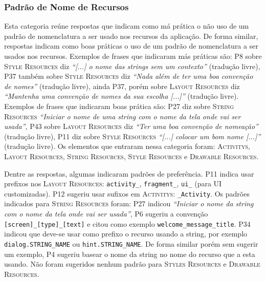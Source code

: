 \subsubsection{Padr\~ao de Nome de Recursos}
Esta categoria re\'une respostas que indicam como m\'a pr\'atica o n\~ao uso de um padr\~ao de nomenclatura a ser usado nos recursos da aplica\c{c}\~ao. De forma similar, respostas indicam como boas pr\'aticas o uso de um padr\~ao de nomenclatura a ser usados nos recursos. Exemplos de frases que indicaram m\'as pr\'aticas s\~ao: P8 sobre \textsc{Style Resources} diz \textit{``[...] o nome das strings sem um contexto''} (tradu\c{c}\~ao livre), P37 tamb\'em sobre \textsc{Style Resources} diz \textit{``Nada al\'em de ter uma boa conven\c{c}\~ao de nomes''} (tradu\c{c}\~ao livre), ainda P37, por\'em sobre \textsc{Layout Resources} diz \textit{``Mantenha uma conven\c{c}\~ao de nomes da sua escolha [...]''} (tradu\c{c}\~ao livre). Exemplos de frases que indicaram boas pr\'atica s\~ao: P27 diz sobre \textsc{String Resources} \textit{``Iniciar o nome de uma string com o nome da tela onde vai ser usada''}, P43 sobre \textsc{Layout Resources} diz \textit{``Ter uma boa conven\c{c}\~ao de nomea\c{c}\~ao''} (tradu\c{c}\~ao livre), P11 diz sobre \textsc{Style Resources} \textit{``[...] colocar um bom nome [...]''} (tradu\c{c}\~ao livre). Os elementos que entraram nessa categoria foram: \textsc{Activitys}, \textsc{Layout Resources}, \textsc{String Resources}, \textsc{Style Resources} e \textsc{Drawable Resources}. 

Dentre as respostas, algumas indicaram padr\~oes de prefer\^encia. P11 indica usar prefixos nos \textsc{Layout Resources}: \texttt{activity\_}, \texttt{fragment\_}, \texttt{ui\_} (para UI customizadas). P12 sugeriu usar sufixos em \textsc{Activitys}: \texttt{\_Activity}. Os padr\~oes indicados para \textsc{String Resources} foram: P27 indicou \textit{``Iniciar o nome da string com o nome da tela onde vai ser usada''}, P6 sugeriu a conven\c{c}\~ao \texttt{[screen]\_[type]\_[text]} e citou como exemplo \texttt{welcome\_message\_title}. P34 indicou que deve-se usar como prefixo o recurso usando a string, por exemplo \texttt{dialog.STRING\_NAME} ou \texttt{hint.STRING\_NAME}. De forma similar por\'em sem sugerir um exemplo, P4 sugeriu basear o nome da string no nome do recurso que a esta usando. N\~ao foram sugeridos nenhum padr\~ao para \textsc{Styles Resources} e \textsc{Drawable Resources}.

